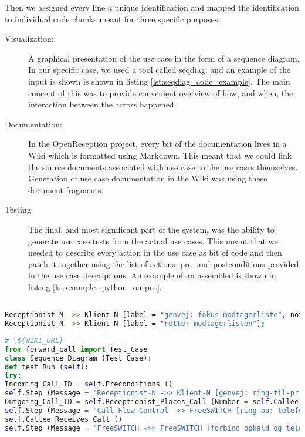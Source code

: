 Then we assigned every line a unique identification and mapped the identification to individual code chunks meant for three specific purposes;
\begin{description}
  \item[Visualization:] A graphical presentation of the use case in the form of a sequence diagram. In our specific case, we used a tool called seqdiag, and an example of the input is shown is shown in listing \ref{lst:seqdiag_code_example}. The main concept of this was to provide convenient overview of how, and when, the interaction between the actors happened.
  \item[Documentation:] In the OpenReception project, every bit of the documentation lives in a Wiki which is formatted using Markdown. This meant that we could link the source documents associated with use case to the use cases themselves. Generation of use case documentation in the Wiki was using these document fragments.
  \item[Testing] The final, and most significant part of the system, was the ability to generate use case tests from the actual use cases. This meant that we needed to describe every action in the use case as bit of code and then patch it together using the list of actions, pre- and postconditions provided in the use case descriptions. An example of an assembled is shown in listing \ref{lst:example_python_output}.
\end{description}
\begin{lstlisting}[language=Bash, caption=Example seqdiag input, label=lst:seqdiag_code_example]

Receptionist-N ->> Klient-N [label = "genvej: fokus-modtagerliste", note = "maaske"];
Receptionist-N ->> Klient-N [label = "retter modtagerlisten"];
\end{lstlisting}

\begin{lstlisting}[language=Python, caption=Example Python code output, label=lst:example_python_output]
# \${WIKI_URL}
from forward_call import Test_Case
class Sequence_Diagram (Test_Case):
def test_Run (self):
try:
Incoming_Call_ID = self.Preconditions ()
self.Step (Message = "Receptionist-N ->> Klient-N [genvej: ring-til-primaert-nummer]")
Outgoing_Call_ID = self.Receptionist_Places_Call (Number = self.Callee.sip_uri ())
self.Step (Message = "Call-Flow-Control ->> FreeSWITCH [ring-op: telefon-N, nummer]")
self.Callee_Receives_Call ()
self.Step (Message = "FreeSWITCH ->> FreeSWITCH [forbind opkald og telefon-N]")
\end{lstlisting}

